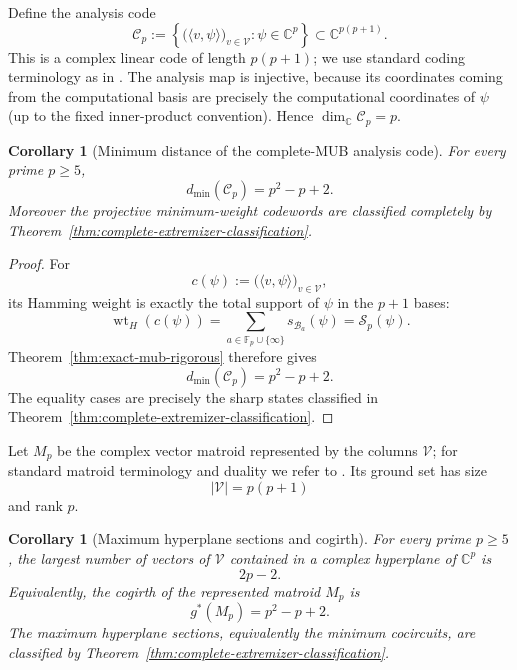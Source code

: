 \documentclass[11pt]{article}
\newtheorem{corollary}[theorem]{Corollary}
\newcommand{\F}{\mathbb F}
\newcommand{\C}{\mathbb C}
\begin{document}
Define the analysis code
\begin{equation}
 \mathcal C_p
 :=
 \left\{
 \bigl(\langle v,\psi\rangle\bigr)_{v\in\mathcal V}:
 \psi\in\C^p
 \right\}
 \subset\C^{p(p+1)}.
 \label{eq:mub-analysis-code}
\end{equation}
This is a complex linear code of length \(p(p+1)\); we use standard coding
terminology as in \cite{HuffmanPless}.  The analysis map is injective, because
its coordinates coming from the computational basis are precisely the
computational coordinates of \(\psi\) (up to the fixed inner-product
convention).  Hence \(\dim_\C\mathcal C_p=p\).

\begin{corollary}[Minimum distance of the complete-MUB analysis code]
\label{cor:mub-code-distance}
For every prime \(p\ge5\),
\begin{equation}
 \boxed{
 d_{\min}(\mathcal C_p)=p^2-p+2.
 }
 \label{eq:mub-code-distance}
\end{equation}
Moreover the projective minimum-weight codewords are classified
completely by
Theorem~\ref{thm:complete-extremizer-classification}.
\end{corollary}

\begin{proof}
For
\[
 c(\psi)
 :=
 \bigl(\langle v,\psi\rangle\bigr)_{v\in\mathcal V},
\]
its Hamming weight is exactly the total support of \(\psi\) in the
\(p+1\) bases:
\[
 \operatorname{wt}_H(c(\psi))
 =
 \sum_{a\in\F_p\cup\{\infty\}}
 s_{\mathcal B_a}(\psi)
 =
 \mathcal S_p(\psi).
\]
Theorem~\ref{thm:exact-mub-rigorous} therefore gives
\[
 d_{\min}(\mathcal C_p)=p^2-p+2.
\]
The equality cases are precisely the sharp states classified in
Theorem~\ref{thm:complete-extremizer-classification}.
\end{proof}

Let \(M_p\) be the complex vector matroid represented by the columns
\(\mathcal V\); for standard matroid terminology and duality we refer to
\cite{Oxley}.  Its ground set has size
\[
 |\mathcal V|=p(p+1)
\]
and rank \(p\).

\begin{corollary}[Maximum hyperplane sections and cogirth]
\label{cor:mub-matroid-cogirth}
For every prime \(p\ge5\), the largest number of vectors of
\(\mathcal V\) contained in a complex hyperplane of \(\C^p\) is
\begin{equation}
 \boxed{2p-2.}
 \label{eq:mub-max-hyperplane}
\end{equation}
Equivalently, the cogirth of the represented matroid \(M_p\) is
\begin{equation}
 \boxed{
 g^*(M_p)=p^2-p+2.
 }
 \label{eq:mub-cogirth}
\end{equation}
The maximum hyperplane sections, equivalently the minimum cocircuits,
are classified by
Theorem~\ref{thm:complete-extremizer-classification}.
\end{corollary}
\end{document}
